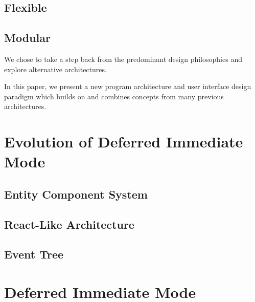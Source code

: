 \documentclass[conference,12pt]{IEEEtran}
\begin{document}
\subsection{Flexible}

\subsection{Modular}

We chose to take a step back from the predominant design philosophies and
explore alternative architectures.


In this paper, we present a new program architecture and user interface design
paradigm which builds on and combines concepts from many previous architectures.

\section{Evolution of Deferred Immediate Mode}

\subsection{Entity Component System}

\subsection{React-Like Architecture}

\subsection{Event Tree}

\section{Deferred Immediate Mode}
\end{document}
